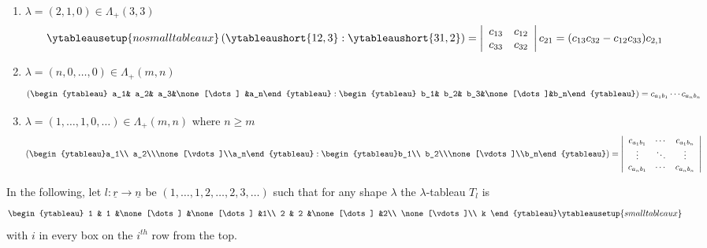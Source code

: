 \documentclass[12pt]{article}
\begin{document}
		\begin{ex}
			\begin{enumerate}
				\item $\lambda=(2,1,0)\in \Lambda_+(3,3)$\[\ytableausetup{nosmalltableaux}\left(\ytableaushort{1 2,3}:\ytableaushort{3 1,2}\right)=\left|\begin{array}{cc}
					c_{13} & c_{12}\\ c_{33} & c_{32}
				\end{array}\right|c_{21}=(c_{13}c_{32}-c_{12}c_{33})c_{2,1}\]
				\item $\lambda=(n,0,\dots,0)\in\Lambda_+(m,n)$\[\left(\begin{ytableau} a_1& a_2& a_3&\none[\dots] &a_n\end{ytableau}:
				\begin{ytableau} b_1& b_2& b_3&\none[\dots]&b_n\end{ytableau}\right)=c_{a_1b_1}\cdots c_{a_nb_n}\]
				\item $\lambda=(1,\dots,1,0,\dots)\in\Lambda_+(m,n)$ where $n\ge m$ \[\left(\begin{ytableau}a_1\\ a_2\\\none[\vdots]\\a_n\end{ytableau}:\begin{ytableau}b_1\\ b_2\\\none[\vdots]\\b_n\end{ytableau}\right)=
					\left|\begin{array}{ccc}c_{a_1b_1} & \cdots & c_{a_1b_n}\\
					\vdots & \ddots & \vdots\\
					c_{a_nb_1} & \cdots & c_{a_nb_n}
					\end{array}\right|\]
			\end{enumerate}
		\end{ex}

		In the following, let $l:\underline r\to\underline n$ be $(1,\dots,1,2,\dots,2,3,\dots)$ such that for any shape $\lambda$ the 
		$\lambda$-tableau $T_l$ is 
		\[\begin{ytableau}
			1 & 1 &\none[\dots] &\none[\dots] &1\\
			2 & 2 &\none[\dots] &2\\
			\none[\vdots]\\
			k
		\end{ytableau}\ytableausetup{smalltableaux}\]
		with $i$ in every box on the $i^{th}$ row from the top.
\end{document}
